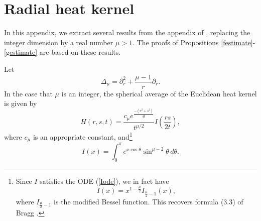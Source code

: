 \documentclass[12pt]{amsart}
\newtheorem{lemma}[thm]{Lemma}
\theoremstyle{others}
\numberwithin{equation}{section}
\newcommand{\p}{\partial}
\begin{document}
\section{Radial heat kernel}




In this appendix, we extract several results from the appendix of \cite{lte}, replacing the integer dimension by a real number $\mu > 1.$ The proofs of Propositions \ref{festimate}-\ref{gestimate} are based on these results.

Let
$$\Delta_\mu = \p_r^2 + \frac{\mu - 1}{r} \p_r.$$
In the case that $\mu$ is an integer, the spherical average of the Euclidean heat kernel is given by
\begin{equation}\label{Halphadef}
H(r,s,t) = \frac{c_\mu e^{\frac{-(r^2 + s^2)}{4t}}}{t^{\mu/2} } I\left( \frac{rs}{2t} \right),
\end{equation}
where $c_\mu$ is an appropriate constant, and\footnote{Since $I$ satisfies the ODE (\ref{Iode}), we in fact have
$$I(x) = x^{1 - \frac{\mu}{2}} I_{\frac{\mu}{2} - 1}(x),$$
where $I_{\frac{\mu}{2} -1}$ is the modified Bessel function. This recovers formula (3.3) of Bragg \cite{braggradialheatpolys}.}
\begin{equation}\label{varphidef}
I(x) = \int_0^\pi e^{x \cos \theta } \sin^{\mu - 2} \theta \, d\theta.
\end{equation}
\end{document}
